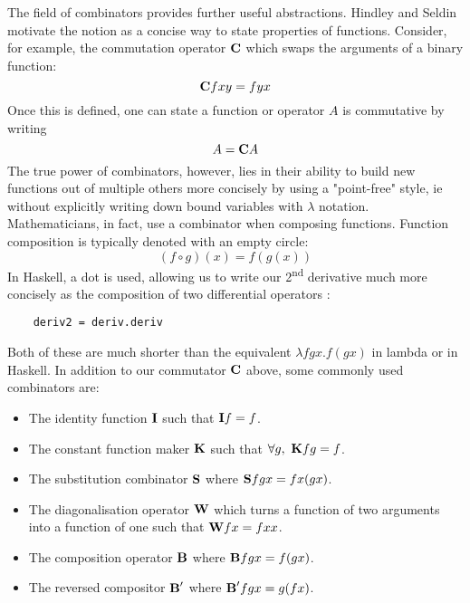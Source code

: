 The field of combinators 
provides further useful abstractions. Hindley and Seldin motivate the notion as a concise way to state properties of functions\cite{LambdaAndCombinatorsIntro}. Consider, for example, the commutation operator ${\textbf C}$ which swaps the arguments of a binary function:
\begin{equation*}
    \textbf C fxy = fyx
\end{equation*}
Once this is defined, one can state a function  or operator $A$ is commutative by writing
\begin{equation*}
    A = \textbf C A
\end{equation*}
The true power of combinators, however, lies in their ability to build new functions out of multiple others more concisely  by using a "point-free" style, ie without explicitly writing down bound variables with $\lambda$ notation. Mathematicians, in fact, use a combinator when composing functions. Function composition is typically denoted with an empty circle:
\begin{equation*}
    (f \circ g)(x) = f(g(x))
\end{equation*}
In Haskell, a dot is used, allowing us to write our 2\textsuperscript{nd} derivative much more concisely as the composition of two differential operators :
\begin{lstlisting}
    deriv2 = deriv.deriv
\end{lstlisting}
Both of these are much shorter than the equivalent $\lambda fgx.f(gx)$ in lambda or  in Haskell. In addition to our commutator $\textbf C$ above, some commonly used combinators are:
\begin{itemize}
    \item The identity function $\textbf I$ such that $\textbf I f = f$. 
    \item The constant function maker $\textbf K$ such that $\forall g,\ \textbf K fg = f$.
    \item The substitution combinator $\textbf S$ where $\textbf S fgx = fx(gx)$.
    \item The diagonalisation operator $\textbf W$ which turns a function of two arguments into a function of one such that $\textbf W fx = fxx$.
    \item The composition operator $\textbf B$ where $\textbf B fgx = f(gx)$.
    \item The reversed compositor $\textbf B'$ where $\textbf B' fgx = g(fx)$.
\end{itemize}
